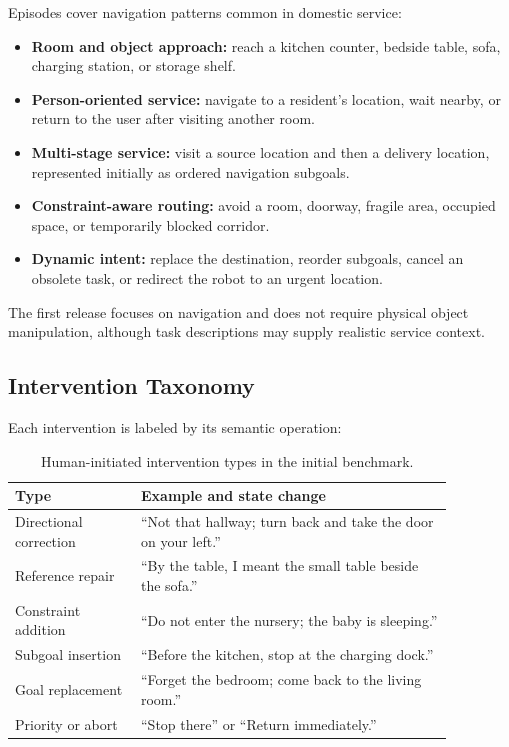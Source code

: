 \documentclass[10pt]{article}
\begin{document}
Episodes cover navigation patterns common in domestic service:
\begin{itemize}[leftmargin=1.4em]
  \item \textbf{Room and object approach:} reach a kitchen counter, bedside
  table, sofa, charging station, or storage shelf.
  \item \textbf{Person-oriented service:} navigate to a resident's location,
  wait nearby, or return to the user after visiting another room.
  \item \textbf{Multi-stage service:} visit a source location and then a
  delivery location, represented initially as ordered navigation subgoals.
  \item \textbf{Constraint-aware routing:} avoid a room, doorway, fragile
  area, occupied space, or temporarily blocked corridor.
  \item \textbf{Dynamic intent:} replace the destination, reorder subgoals,
  cancel an obsolete task, or redirect the robot to an urgent location.
\end{itemize}
The first release focuses on navigation and does not require physical object
manipulation, although task descriptions may supply realistic service context.

\subsection{Intervention Taxonomy}

Each intervention is labeled by its semantic operation:
\begin{table}[t]
\centering
\small
\begin{tabular}{p{0.25\linewidth}p{0.62\linewidth}}
\toprule
\textbf{Type} & \textbf{Example and state change}\\
\midrule
Directional correction &
``Not that hallway; turn back and take the door on your left.''\\
Reference repair &
``By the table, I meant the small table beside the sofa.''\\
Constraint addition &
``Do not enter the nursery; the baby is sleeping.''\\
Subgoal insertion &
``Before the kitchen, stop at the charging dock.''\\
Goal replacement &
``Forget the bedroom; come back to the living room.''\\
Priority or abort &
``Stop there'' or ``Return immediately.''\\
\bottomrule
\end{tabular}
\caption{Human-initiated intervention types in the initial benchmark.}
\label{tab:interventions}
\end{table}
\end{document}
